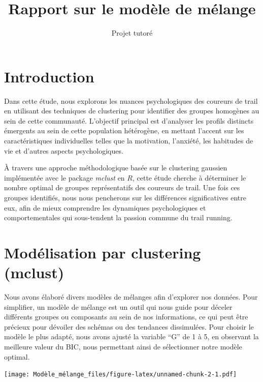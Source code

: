 \documentclass[
]{article}
\title{\Huge{Rapport sur le modèle de mélange}}
\author{\Large{Projet tutoré}}
\author{}
\date{\vspace{-2.5em}}
\let\origfigure\figure
\let\endorigfigure\endfigure
\renewenvironment{figure}[1][2]{
    \expandafter\origfigure\expandafter[H]
} {
    \endorigfigure
}
\begin{document}
\newpage
\tableofcontents

\newpage

\hypertarget{introduction}{%
\section{Introduction}\label{introduction}}

Dans cette étude, nous explorons les nuances psychologiques des coureurs
de trail en utilisant des techniques de clustering pour identifier des
groupes homogènes au sein de cette communauté. L'objectif principal est
d'analyser les profils distincts émergents au sein de cette population
hétérogène, en mettant l'accent sur les caractéristiques individuelles
telles que la motivation, l'anxiété, les habitudes de vie et d'autres
aspects psychologiques.

À travers une approche méthodologique basée sur le clustering gaussien
implémentée avec le package \emph{mclust} en \(R\), cette étude cherche
à déterminer le nombre optimal de groupes représentatifs des coureurs de
trail. Une fois ces groupes identifiés, nous nous pencherons sur les
différences significatives entre eux, afin de mieux comprendre les
dynamiques psychologiques et comportementales qui sous-tendent la
passion commune du trail running.

\newpage

\hypertarget{moduxe9lisation-par-clustering-mclust}{%
\section{Modélisation par clustering
(mclust)}\label{moduxe9lisation-par-clustering-mclust}}

Nous avons élaboré divers modèles de mélanges afin d'explorer nos
données. Pour simplifier, un modèle de mélange est un outil qui nous
guide pour déceler différents groupes ou composants au sein de nos
informations, ce qui peut être précieux pour dévoiler des schémas ou des
tendances dissimulées. Pour choisir le modèle le plus adapté, nous avons
ajusté la variable ``G'' de 1 à 5, en observant la meilleure valeur du
BIC, nous permettant ainsi de sélectionner notre modèle optimal.

\begin{figure}
\centering
\texttt{[image: Modèle\_mélange\_files/figure-latex/unnamed-chunk-2-1.pdf]}
\caption{Comparaison des valeurs BIC pour différents modèles}
\end{figure}
\end{document}
